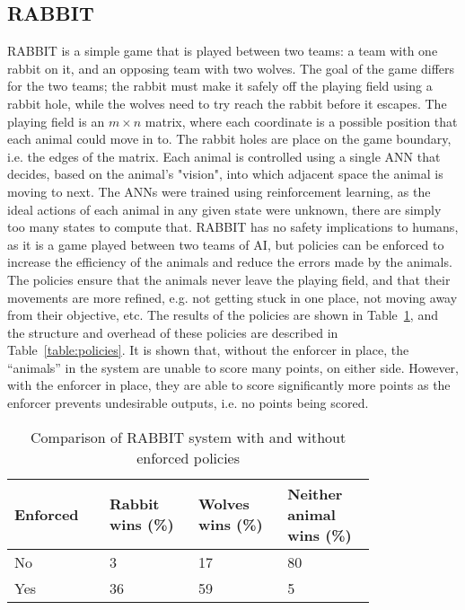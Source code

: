 \subsection{RABBIT} \label{sec:rabbit}
RABBIT is a simple game that is played between two teams: a team with one rabbit on it, and an opposing team with two wolves. 
The goal of the game differs for the two teams; the rabbit must make it safely off the playing field using a rabbit hole, while the wolves need to try reach the rabbit before it escapes.
The playing field is an $m\times{n}$ matrix, where each coordinate is a possible position that each animal could move in to.
The rabbit holes are place on the game boundary, i.e. the edges of the matrix.
Each animal is controlled using a single \ac{ANN} that decides, based on the animal's "vision", into which adjacent space the animal is moving to next.
The \acp{ANN} were trained using reinforcement learning, as the ideal actions of each animal in any given state were unknown, there are simply too many states to compute that.
RABBIT has no safety implications to humans, as it is a game played between two teams of \ac{AI}, but policies can be enforced to increase the efficiency of the animals and reduce the errors made by the animals.
The policies ensure that the animals never leave the playing field, and that their movements are more refined, e.g. not getting stuck in one place, not moving away from their objective, etc.
The results of the policies are shown in Table~\ref{table:rabbitres}, and the structure and overhead of these policies are described in Table~\ref{table:policies}.
It is shown that, without the enforcer in place, the ``animals'' in the system are unable to score many points, on either side.
However, with the enforcer in place, they are able to score significantly more points as the enforcer prevents undesirable outputs, i.e. no points being scored.

\begin{table}[h]
	\centering
	\caption{Comparison of RABBIT system with and without enforced policies}
	\label{table:rabbitres}
	\begin{tabular}{|p{0.2\linewidth}|p{0.2\linewidth}|p{0.2\linewidth}|p{0.2\linewidth}|}
		\hline Enforced & Rabbit wins (\%) &  Wolves wins (\%) & Neither animal wins (\%) \\ \hline
		No & 3 & 17 & 80 \\
		Yes & 36 & 59 & 5 \\ \hline       
	\end{tabular}
\end{table}
